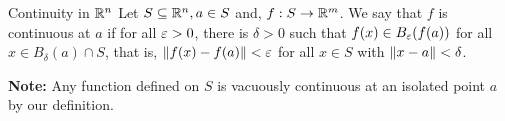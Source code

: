 \documentclass[../Analysis-3.tex]{subfiles}
\begin{document}
\begin{Def}{Continuity in $ \mathbb{R}^n $}{}
  Let $ S \subseteq \mathbb{R}^n, a \in S $ and, $ f: S \to \mathbb{R}^m $. We say that $ f $ is continuous at $ a $ if for all $ \varepsilon > 0 $, there is $ \delta > 0 $ such that $ f(x) \in B_\varepsilon(f(a)) $ for all $ x \in B_\delta(a) \cap S $, that is, $ \norm{f(x) - f(a)} < \varepsilon $ for all $ x \in S $ with $ \norm{x - a} < \delta $.
\end{Def}

\textbf{Note:} Any function defined on $ S $ is vacuously continuous at an isolated point $ a $ by our definition.
\end{document}
